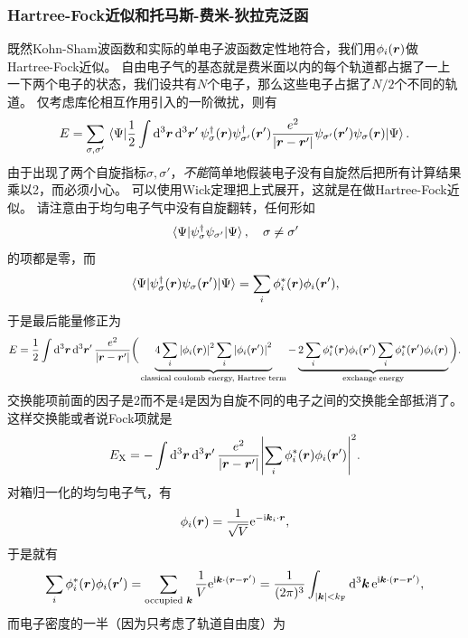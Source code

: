 \subsubsection{Hartree-Fock近似和托马斯-费米-狄拉克泛函}

既然Kohn-Sham波函数和实际的单电子波函数定性地符合，我们用$\phi_i(\vb*{r})$做Hartree-Fock近似。
自由电子气的基态就是费米面以内的每个轨道都占据了一上一下两个电子的状态，我们设共有$N$个电子，那么这些电子占据了$N/2$个不同的轨道。
仅考虑库伦相互作用引入的一阶微扰，则有
\[
    E = \sum_{\sigma, \sigma'} \mel{\Psi}{
        \frac{1}{2} \int \dd[3]{\vb*{r}} \dd[3]{\vb*{r}'} {\psi}^\dagger_{\sigma}(\vb*{r}) {\psi}^\dagger_{\sigma'}(\vb*{r}') \frac{e^2}{\abs{\vb*{r} - \vb*{r}'}} {\psi}_{\sigma'}(\vb*{r}') {\psi}_\sigma(\vb*{r})
    }{\Psi}.
\]
由于出现了两个自旋指标$\sigma, \sigma'$，\emph{不能}简单地假装电子没有自旋然后把所有计算结果乘以2，而必须小心。
可以使用Wick定理把上式展开，这就是在做Hartree-Fock近似。
请注意由于均匀电子气中没有自旋翻转，任何形如
\[
    \mel{\Psi}{{\psi}_\sigma^\dagger {\psi}_{\sigma'}}{\Psi}, \quad \sigma \neq \sigma'
\]
的项都是零，而
\[
    \mel{\Psi}{{\psi}^\dagger_\sigma(\vb*{r}) {\psi}_{\sigma}(\vb*{r}')}{\Psi} = \sum_i \phi_i^*(\vb*{r}) \phi_i(\vb*{r}'),
\]
于是最后能量修正为
\[
    E = \frac{1}{2} \int \dd[3]{\vb*{r}} \dd[3]{\vb*{r}'} \frac{e^2}{\abs{\vb*{r} - \vb*{r}'}} \bigg(
        \underbrace{4 \sum_{i} \abs{\phi_i(\vb*{r})}^2 \sum_{i} \abs{\phi_i(\vb*{r}')}^2}_\text{classical coulomb energy, Hartree term} - \underbrace{2 \sum_i \phi_i^*(\vb*{r}) \phi_i(\vb*{r}') \sum_i \phi_i^*(\vb*{r}') \phi_i(\vb*{r})}_\text{exchange energy}
    \bigg).
\]
交换能项前面的因子是$2$而不是$4$是因为自旋不同的电子之间的交换能全部抵消了。这样交换能或者说Fock项就是
\begin{equation}
    E_\text{X} = - \int \dd[3]{\vb*{r}} \dd[3]{\vb*{r}'} \frac{e^2}{\abs{\vb*{r} - \vb*{r}'}} \abs{\sum_i \phi_i^*(\vb*{r}) \phi_i(\vb*{r}')}^2 . 
    \label{eq:exchange-energy-homogeneous-gas}
\end{equation}
对箱归一化的均匀电子气，有
\[
    \phi_i(\vb*{r}) = \frac{1}{\sqrt{V}} \mathrm{e}^{- \mathrm{i} \vb*{k}_i \cdot \vb*{r}},
\]
于是就有
\begin{equation}
    \sum_i \phi_i^*(\vb*{r}) \phi_i(\vb*{r}') = \sum_{\text{occupied $\vb*{k}$}} \frac{1}{V} \mathrm{e}^{\mathrm{i} \vb*{k} \cdot (\vb*{r} - \vb*{r}')} = \frac{1}{(2\pi)^3} \int_{\abs{\vb*{k}} < k_\text{F}} \dd[3]{\vb*{k}} \mathrm{e}^{\mathrm{i} \vb*{k} \cdot (\vb*{r} - \vb*{r}')},
    \label{eq:homogeneous-density}
\end{equation}
而电子密度的一半（因为只考虑了轨道自由度）为
